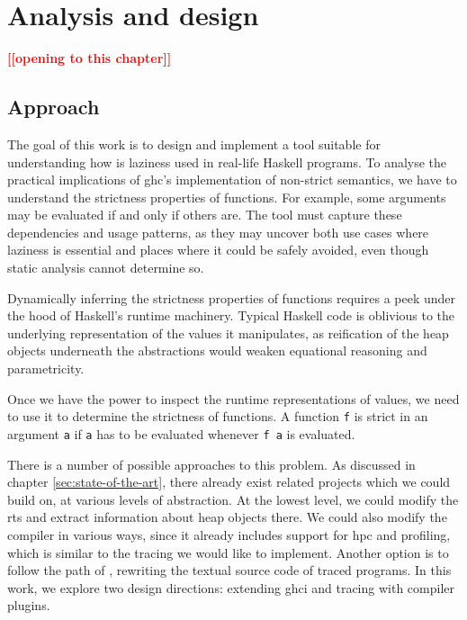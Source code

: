\documentclass[thesis=B,english]{FITthesis}[2019/12/23]
\newcommand{\todo}[1]{\textcolor{red}{\textbf{[[#1]]}}}
\newcommand{\hsIdent}[1]{\texttt{#1}}
\newcommand{\hsCode}[1]{\texttt{#1}}
\begin{document}
\chapter{Analysis and design} \label{sec:analysis-design}

\todo{opening to this chapter}

\section{Approach} \label{sec:approach}

The goal of this work is to design and implement a tool suitable for
understanding how is laziness used in real-life Haskell programs. To analyse
the practical implications of \acrshort{ghc}'s implementation of non-strict
semantics, we have to understand the strictness properties of functions. For
example, some arguments may be evaluated if and only if others are. The tool
must capture these dependencies and usage patterns, as they may uncover both
use cases where laziness is essential and places where it could be safely
avoided, even though static analysis cannot determine so.

Dynamically inferring the strictness properties of functions requires a peek
under the hood of Haskell's runtime machinery. Typical Haskell code is
oblivious to the underlying representation of the values it manipulates, as
reification of the heap objects underneath the abstractions would weaken
equational reasoning and parametricity.

Once we have the power to inspect the runtime representations of values, we
need to use it to determine the strictness of functions. A function \hsIdent{f}
is strict in an argument \hsIdent{a} if \hsIdent{a} has to be evaluated
whenever \hsCode{f a} is evaluated.

There is a number of possible approaches to this problem. As discussed in
chapter \ref{sec:state-of-the-art}, there already exist related projects which
we could build on, at various levels of abstraction. At the lowest level, we
could modify the \acrshort{rts} and extract information about heap objects
there. We could also modify the compiler in various ways, since it already
includes support for \acrshort{hpc} and profiling, which is similar to the
tracing we would like to implement. Another option is to follow the path of
, rewriting the textual source code of traced programs. In
this work, we explore two design directions: extending \acrshort{ghci} and
tracing with compiler plugins.
\end{document}
